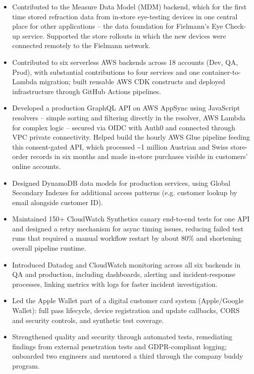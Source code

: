 \documentclass[10pt,letterpaper]{article}
\begin{document}
\begin{itemize}
  \item Contributed to the Measure Data Model (MDM) backend, which for the first time stored refraction data from in-store eye-testing devices in one central place for other applications -- the data foundation for Fielmann's Eye Check-up service. Supported the store rollouts in which the new devices were connected remotely to the Fielmann network.
  \item Contributed to six serverless AWS backends across 18 accounts (Dev, QA, Prod), with substantial contributions to four services and one container-to-Lambda migration; built reusable AWS CDK constructs and deployed infrastructure through GitHub Actions pipelines.
  \item Developed a production GraphQL API on AWS AppSync using JavaScript resolvers -- simple sorting and filtering directly in the resolver, AWS Lambda for complex logic -- secured via OIDC with Auth0 and connected through VPC private connectivity. Helped build the hourly AWS Glue pipeline feeding this consent-gated API, which processed \textasciitilde 1 million Austrian and Swiss store-order records in six months and made in-store purchases visible in customers' online accounts.
  \item Designed DynamoDB data models for production services, using Global Secondary Indexes for additional access patterns (e.g. customer lookup by email alongside customer ID).
  \item Maintained 150+ CloudWatch Synthetics canary end-to-end tests for one API and designed a retry mechanism for async timing issues, reducing failed test runs that required a manual workflow restart by about 80\% and shortening overall pipeline runtime.
  \item Introduced Datadog and CloudWatch monitoring across all six backends in QA and production, including dashboards, alerting and incident-response processes, linking metrics with logs for faster incident investigation.
  \item Led the Apple Wallet part of a digital customer card system (Apple/Google Wallet): full pass lifecycle, device registration and update callbacks, CORS and security controls, and synthetic test coverage.
  \item Strengthened quality and security through automated tests, remediating findings from external penetration tests and GDPR-compliant logging; onboarded two engineers and mentored a third through the company buddy program.
\end{itemize}
\end{document}

